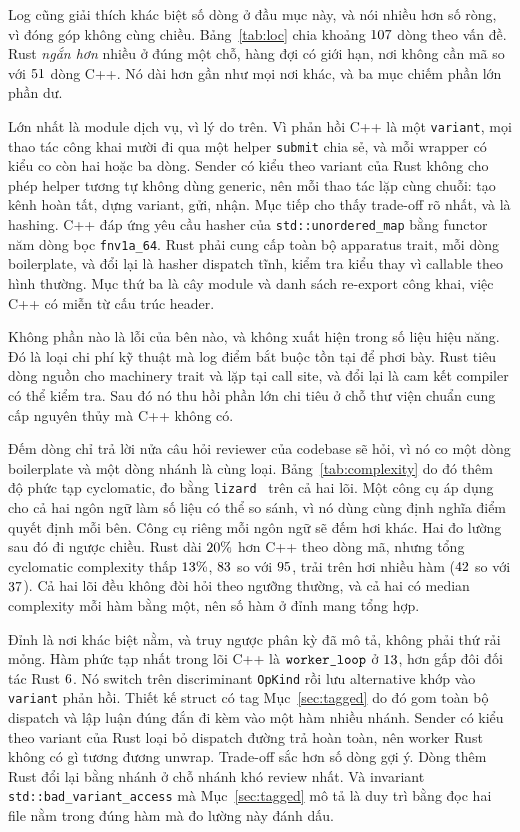Log cũng giải thích khác biệt số dòng ở đầu mục này, và
nói nhiều hơn số ròng, vì đóng góp không cùng chiều.
Bảng~\ref{tab:loc} chia khoảng $107$ dòng theo vấn đề. Rust
\emph{ngắn hơn} nhiều ở đúng một chỗ, hàng đợi có giới hạn, nơi không cần mã
so với $51$ dòng C++. Nó dài hơn gần như mọi nơi khác, và
ba mục chiếm phần lớn phần dư.

Lớn nhất là module dịch vụ, vì lý do trên. Vì phản hồi C++ là một
\texttt{variant}, mọi thao tác công khai mười đi qua một helper \texttt{submit}
chia sẻ, và mỗi wrapper có kiểu co còn hai hoặc ba dòng. Sender có kiểu theo variant của Rust
không cho phép helper tương tự không dùng generic, nên mỗi thao tác lặp cùng chuỗi:
tạo kênh hoàn tất, dựng variant, gửi, nhận. Mục tiếp cho thấy trade-off rõ nhất, và là hashing. C++ đáp ứng
yêu cầu hasher của \texttt{std::unordered\_map} bằng functor năm dòng bọc
\texttt{fnv1a\_64}. Rust phải cung cấp toàn bộ apparatus trait, mỗi dòng
boilerplate, và đổi lại là hasher dispatch tĩnh, kiểm tra kiểu thay vì
callable theo hình thường. Mục thứ ba là cây module và danh sách re-export công khai,
việc C++ có miễn từ cấu trúc header.

Không phần nào là lỗi của bên nào, và không xuất hiện trong số liệu hiệu năng.
Đó là loại chi phí kỹ thuật mà log điểm bắt buộc tồn tại để phơi bày. Rust tiêu dòng nguồn
cho machinery trait và lặp tại call site, và đổi lại là cam kết
compiler có thể kiểm tra. Sau đó nó thu hồi phần lớn chi tiêu ở chỗ thư viện chuẩn
cung cấp nguyên thủy mà C++ không có.

Đếm dòng chỉ trả lời nửa câu hỏi reviewer của codebase sẽ hỏi,
vì nó co một dòng boilerplate và một dòng nhánh là cùng loại.
Bảng~\ref{tab:complexity} do đó thêm độ phức tạp cyclomatic, đo bằng
\texttt{lizard}~\cite{lizard} trên cả hai lõi. Một công cụ áp dụng cho cả hai ngôn ngữ làm
số liệu có thể so sánh, vì nó dùng cùng định nghĩa điểm quyết định mỗi bên.
Công cụ riêng mỗi ngôn ngữ sẽ đếm hơi khác. Hai đo lường sau đó
đi ngược chiều. Rust dài $20\%$ hơn C++ theo dòng mã, nhưng
tổng cyclomatic complexity thấp $13\%$, $83$ so với
$95$, trải trên hơi nhiều hàm ($42$ so với $37$). Cả hai
lõi đều không đòi hỏi theo ngưỡng thường, và cả hai có median complexity
mỗi hàm bằng một, nên số hàm ở đỉnh mang tổng hợp.

Đỉnh là nơi khác biệt nằm, và truy ngược phân kỳ đã mô tả,
không phải thứ rải mỏng. Hàm phức tạp nhất trong lõi C++ là
$\texttt{worker\_loop}$ ở $13$, hơn gấp đôi đối tác Rust $6$. Nó
switch trên discriminant \texttt{OpKind} rồi lưu alternative khớp vào
\texttt{variant} phản hồi. Thiết kế struct có tag Mục~\ref{sec:tagged} do đó
gom toàn bộ dispatch và lập luận đúng đắn đi kèm vào một hàm nhiều nhánh.
Sender có kiểu theo variant của Rust loại bỏ dispatch đường trả hoàn toàn, nên
worker Rust không có gì tương đương unwrap. Trade-off sắc hơn số dòng
gợi ý. Dòng thêm Rust đổi lại bằng nhánh ở chỗ
nhánh khó review nhất. Và invariant \texttt{std::bad\_variant\_access} mà
Mục~\ref{sec:tagged} mô tả là duy trì bằng đọc hai file nằm trong
đúng hàm mà đo lường này đánh dấu.

